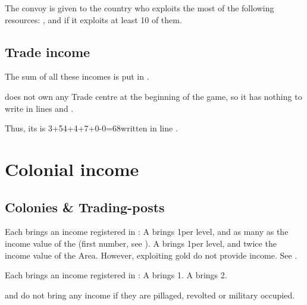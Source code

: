 \aparag The  convoy is given to the country who
exploits the most of the following resources: ,  and  if it exploits at least 10 of them.

\subsection{Trade income}
\aparag The sum of all these incomes is put in .

\begin{exemple}
  \POR does not own any Trade centre at the beginning of the game, so it
  has nothing to write in lines  and
  .

  Thus, its  is 3+54+4+7+0-0=68\ducats written in
  line .
\end{exemple}

\section{Colonial income}\label{chIncomes:ColonialIncome}
\subsection{Colonies \& Trading-posts}

\aparag Each \COL brings an income registered in :
\bparag A \COL\facemoins brings 1\ducats per level, and as many \ducats
as the income value of the \Area (first number, see
).
\bparag A \COL\faceplus brings 1\ducats per level, and twice the income
value of the Area.
\bparag However, \COL exploiting gold do not provide income. See
.

\aparag Each \TP brings an income registered in :
\bparag A \TP\facemoins brings 1\ducats.
\bparag A \TP\faceplus brings 2\ducats.

\aparag \COL and \TP do not bring any income if they are pillaged,
revolted or military occupied.

